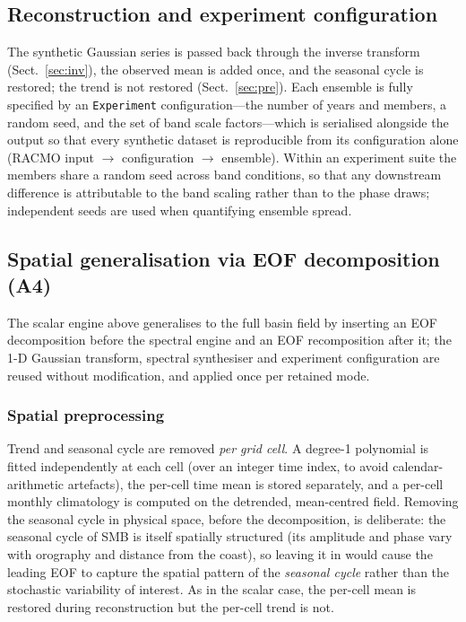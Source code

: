 \subsection{Reconstruction and experiment configuration}\label{sec:recon}

The synthetic Gaussian series is passed back through the inverse transform
(Sect.~\ref{sec:inv}), the observed mean is added once, and the seasonal
cycle is restored; the trend is not restored (Sect.~\ref{sec:pre}). Each
ensemble is fully specified by an \texttt{Experiment} configuration---the
number of years and members, a random seed, and the set of band scale
factors---which is serialised alongside the output so that every synthetic
dataset is reproducible from its configuration alone (RACMO input
$\rightarrow$ configuration $\rightarrow$ ensemble). Within an experiment
suite the members share a random seed across band conditions, so that any
downstream difference is attributable to the band scaling rather than to the
phase draws; independent seeds are used when quantifying ensemble spread.

\subsection{Spatial generalisation via EOF decomposition (A4)}\label{sec:eof}

The scalar engine above generalises to the full basin field by inserting an
EOF decomposition before the spectral engine and an EOF recomposition after
it; the 1-D Gaussian transform, spectral synthesiser and experiment
configuration are reused without modification, and applied once per retained
mode.

\subsubsection{Spatial preprocessing}
Trend and seasonal cycle are removed \emph{per grid cell}. A degree-1
polynomial is fitted independently at each cell (over an integer time index,
to avoid calendar-arithmetic artefacts), the per-cell time mean is stored
separately, and a per-cell monthly climatology is computed on the detrended,
mean-centred field. Removing the seasonal cycle in physical space, before the
decomposition, is deliberate: the seasonal cycle of SMB is itself spatially
structured (its amplitude and phase vary with orography and distance from the
coast), so leaving it in would cause the leading EOF to capture the spatial
pattern of the \emph{seasonal cycle} rather than the stochastic variability
of interest. As in the scalar case, the per-cell mean is restored during
reconstruction but the per-cell trend is not.


